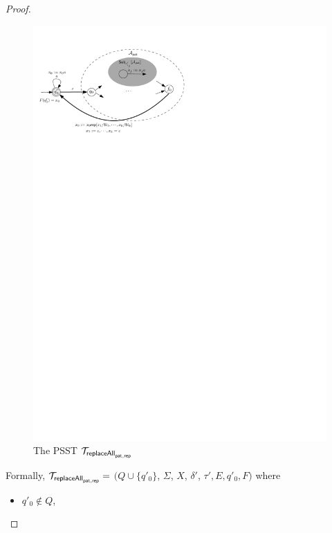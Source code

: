 \begin{proof}
        \begin{figure}[ht]
            \centering
            \includegraphics[scale=0.9]{psst-replaceall.pdf}
            \caption{The PSST $\mathcal{T}_{\mathsf{replaceAll}_{\mathsf{pat},\mathsf{rep}}}$}
            \label{fig-psst-replaceall}
        \end{figure}

        Formally, $\mathcal{T}_{\mathsf{replaceAll}_{\mathsf{pat}, \mathsf{rep}}} =$ $(Q \cup \{q'_0\}$, $\Sigma$, $X$, $\delta'$, $\tau', E, q'_0, F)$ where
        \begin{itemize}
            \item $q'_0 \not \in Q$,


\end{itemize}
\end{proof}
